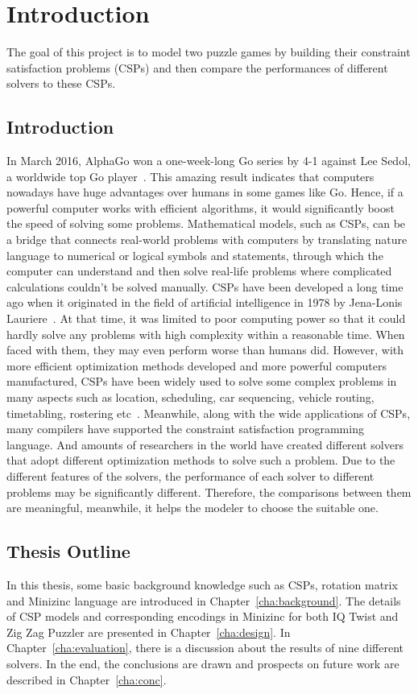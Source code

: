 \chapter{Introduction}
\label{cha:intro}
The goal of this project is to model two puzzle games by building their constraint satisfaction problems (CSPs) and then compare the performances of different solvers to these CSPs.
\section{Introduction}
\label{sec:introduction}
In March 2016, AlphaGo won a one-week-long Go series by 4-1 against Lee Sedol, a worldwide top Go player~\cite{r26}. This amazing result indicates that computers nowadays have huge advantages over humans in some games like Go. Hence, if a powerful computer works with efficient algorithms, it would significantly boost the speed of solving some problems. Mathematical models, such as CSPs, can be a bridge that connects real-world problems with computers by translating nature language to numerical or logical symbols and statements, through which the computer can understand and then solve real-life problems where complicated calculations couldn’t be solved manually. CSPs have been developed a long time ago when it originated in the field of artificial intelligence in 1978 by Jena-Lonis Lauriere~\cite{r27}. At that time, it was limited to poor computing power so that it could hardly solve any problems with high complexity within a reasonable time. When faced with them, they may even perform worse than humans did. However, with more efficient optimization methods developed and more powerful computers manufactured, CSPs have been widely used to solve some complex problems in many aspects such as location, scheduling, car sequencing, vehicle routing, timetabling, rostering etc~\cite{r28}. Meanwhile, along with the wide applications of CSPs, many compilers have supported the constraint satisfaction programming language. And amounts of researchers in the world have created different solvers that adopt different optimization methods to solve such a problem. Due to the different features of the solvers, the performance of each solver to different problems may be significantly different. Therefore, the comparisons between them are meaningful, meanwhile, it helps the modeler to choose the suitable one.
\section{Thesis Outline}
\label{sec:outline}
In this thesis, some basic background knowledge such as CSPs, rotation matrix and Minizinc language are introduced in Chapter~\ref{cha:background}. The details of CSP models and corresponding encodings in Minizinc for both IQ Twist and Zig Zag Puzzler are presented in Chapter~\ref{cha:design}. In Chapter~\ref{cha:evaluation}, there is a discussion about the results of nine different solvers. In the end, the conclusions are drawn and prospects on future work are described in Chapter~\ref{cha:conc}.
